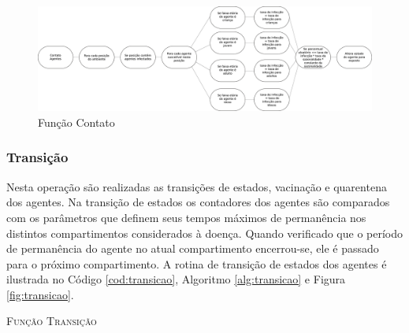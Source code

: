 \begin{figure}[H]
  \centering
  \includegraphics[width=1\textwidth]{Figuras/EstruturasDadosEstrategias/Operadores/Contato.eps}
  \caption{Função Contato}
  \label{fig:contato}
\end{figure} 

\newpage

\subsubsection{Transição}


Nesta operação são realizadas as transições de estados, vacinação e quarentena dos agentes. Na transição de estados os contadores dos agentes são comparados com os parâmetros que definem seus tempos máximos de permanência nos distintos compartimentos considerados à doença. Quando verificado que o período de permanência do agente no atual compartimento encerrou-se, ele é passado para o próximo compartimento. A rotina de transição de estados dos agentes é ilustrada no Código \ref{cod:transicao}, Algoritmo \ref{alg:transicao} e Figura \ref{fig:transicao}. 



\begin{algorithm}[H]
 \SetAlgoLined  
 
 \caption{\textsc{Função Transição}} 
 \label{alg:transicao}
\end{algorithm}

